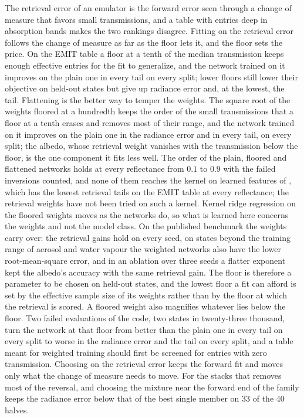 \documentclass[11pt]{article}
\theoremstyle{remark}
\newcommand{\1}{\mathbf{1}}
\begin{document}
The retrieval error of an emulator is the forward error seen through a change of measure that favors small
transmissions, and a table with entries deep in absorption bands makes the two rankings disagree. Fitting on the
retrieval error follows the change of measure as far as the floor lets it, and the floor sets the price. On the EMIT
table a floor at a tenth of the median transmission keeps enough effective entries for the fit to generalize, and the
network trained on it improves on the plain one in every tail on every split; lower floors still lower their objective on held-out
states but give up radiance error and, at the lowest, the tail. Flattening is the better way to temper the weights. The
square root of the weights floored at a hundredth keeps the order of the small transmissions that a floor at a tenth
erases and removes most of their range, and the network trained on it improves on the plain one in the radiance error
and in every tail, on every split; the albedo, whose retrieval weight vanishes with the transmission below the floor,
is the one component it fits less well. The order of the plain, floored and flattened networks holds at every
reflectance from $0.1$ to $0.9$ with the failed inversions counted, and none of them reaches the kernel on learned
features of \cite{shmalo2}, which has the lowest retrieval tails on the EMIT table at every reflectance; the retrieval
weights have not been tried on such a kernel. Kernel ridge regression on the floored weights moves as the networks do, so what is
learned here concerns the weights and not the model class. On the published benchmark the weights carry over: the
retrieval gains hold on every seed, on states beyond the training range of aerosol and water vapour the weighted
networks also have the lower root-mean-square error, and in an ablation over three seeds a flatter exponent kept the
albedo's accuracy with the same retrieval gain.
The floor is therefore a parameter to be chosen on held-out states, and the lowest floor a fit can afford is set by
the effective sample size of its weights rather than by the floor at which the retrieval is scored. A floored weight
also magnifies whatever lies below the floor. Two failed evaluations of the code, two states in twenty-three thousand,
turn the network at that floor from better than the plain one in every tail on every split to worse in the radiance error and the
tail on every split, and a table meant
for weighted training should first be screened for entries with zero transmission. Choosing on the retrieval error
keeps the forward fit and moves only what the change of measure needs to move. For the stacks that removes most of the
reversal, and choosing the mixture near the forward end of the family keeps the radiance error below that of the best
single member on 33 of the 40 halves.
\end{document}
